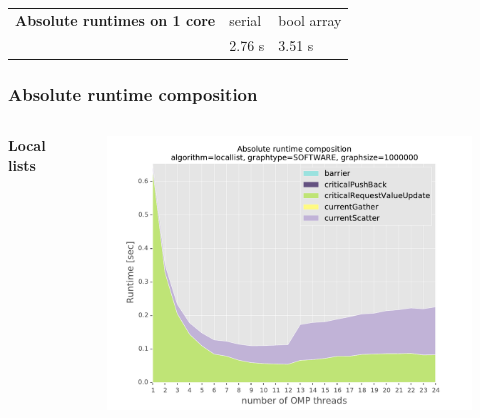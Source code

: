 \begin{frame}
\begin{columns}[T]
\begin{figure}[!ht]
\begin{center}
    \end{center}
  \end{figure}  
\end{columns}

\begin{table}
\tiny
\begin{tabular}{lp{1cm}|p{1cm}}
 {\bfseries Absolute runtimes on 1 core}  & serial  & bool array \\
                                          & 2.76 s  & 3.51 s
\end{tabular}
\end{table}

\end{frame}


\begin{frame}
 \frametitle{Absolute runtime composition}
 \begin{columns}[T]
  \bfseries{Local lists}
  \begin{figure}[!ht]
    \begin{center}
      \includegraphics[width=\textwidth]{img/timeabs_locallist_gtSOFTWARE_s1000000_opt0.pdf}
    \end{center}
  \end{figure}


\end{columns}
\end{frame}
